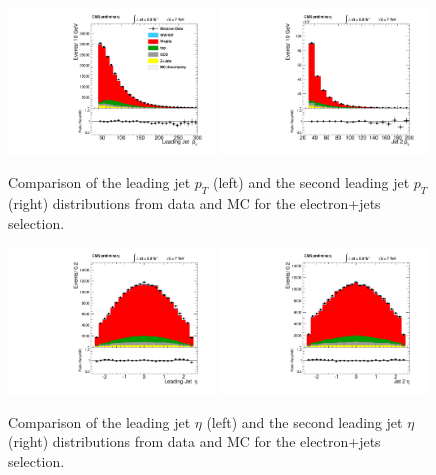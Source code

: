 \begin{figure}[h!t]
  {\centering
    \includegraphics[width=0.49\textwidth]{plots/2012_DataMC/el_jetld_pt.pdf}
    \includegraphics[width=0.49\textwidth]{plots/2012_DataMC/el_jetnt_pt.pdf}
    \caption{Comparison of the leading jet $p_{T} $ (left) and the
      second leading jet $p_{T} $ (right) distributions from data and MC
      for the electron+jets selection.}
    \label{fig:elec_jet_pt}}
\end{figure}
\begin{figure}[h!t]
  {\centering
    \includegraphics[width=0.49\textwidth]{plots/2012_DataMC/el_jetld_eta.pdf}
    \includegraphics[width=0.49\textwidth]{plots/2012_DataMC/el_jetnt_eta.pdf}
    \caption{Comparison of the leading jet $\eta $ (left) and the
      second leading jet $\eta $ (right) distributions from data and MC for the electron+jets selection.}
    \label{fig:elec_jet_eta}}
\end{figure}
